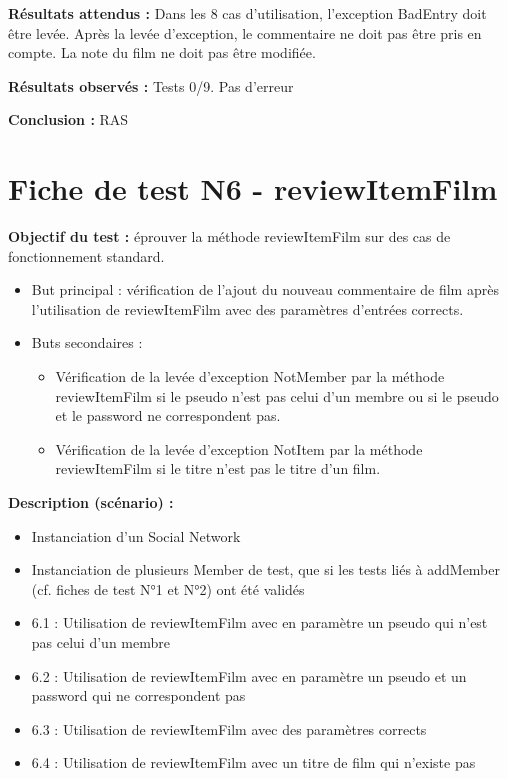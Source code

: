 \documentclass[12pt,a4paper]{report}
\begin{document}
\textbf{Résultats attendus :}
Dans les 8 cas d'utilisation, l'exception BadEntry doit être levée.
Après la levée d'exception, le commentaire ne doit pas être  pris en compte. La note du film ne doit pas être modifiée.

\textbf{Résultats observés :}
Tests 0/9. Pas d'erreur

\textbf{Conclusion :} RAS

\chapter{Fiche de test N6 - reviewItemFilm}    

\textbf{Objectif du test : }éprouver la méthode reviewItemFilm sur des cas de fonctionnement standard.
\begin{itemize}
	\item	But principal : vérification de l'ajout du nouveau commentaire de film après l'utilisation de reviewItemFilm avec des paramètres d'entrées corrects.
	\item	Buts secondaires :
	\begin{itemize}
		\item Vérification de la levée d'exception NotMember par la méthode reviewItemFilm si le pseudo n'est pas celui d'un membre ou si le pseudo et le password ne correspondent pas.
		\item Vérification de la levée d'exception NotItem par la méthode reviewItemFilm si le titre n’est pas le titre d’un film.

	\end{itemize}

\end{itemize}

\textbf{Description (scénario) :}
\begin{itemize}
	\item	Instanciation d'un Social Network
	\item	Instanciation de plusieurs Member de test, que si les tests liés à addMember (cf. fiches de test N°1 et N°2) ont été validés
	\item	6.1 : Utilisation de reviewItemFilm avec en paramètre un pseudo qui n'est pas celui d'un membre 
	\item	6.2 : Utilisation de reviewItemFilm avec en paramètre un pseudo et un password qui ne correspondent pas
	\item	6.3 : Utilisation de reviewItemFilm avec des paramètres corrects
	\item	6.4 : Utilisation de reviewItemFilm avec un titre de film qui n’existe pas
\end{itemize}
\end{document}
